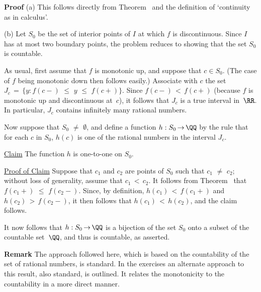 \V

        {\bf Proof} (a) This follows directly from Theorem~ and the definition of `continuity as in calculus'.

\V

        (b) Let $S_{0}$ be the set of interior points of $I$ at which $f$ is discontinuous.
    Since $I$ has at most two boundary points, the problem reduces to showing that the set $S_{0}$ is countable.

    As usual, first assume that $f$ is monotonic up, and suppose that $c{\in}S_{0}$. (The case of $f$ being monotonic down then follows easily.)
    Associate with $c$ the set $J_{c} \,=\, \{y: f(c-)\,\,{\leq}\,\,y\,\,{\leq}\,\,f(c+)\}$.
    Since $f(c-)\,<\,f(c+)$ (because $f$ is monotonic up and discontinuous at~$c$),
    it follows that $J_{c}$ is a true interval in~${\RR}$. In particular, $J_{c}$ contains infinitely many rational numbers.

        Now suppose that $S_{0} \,\,{\neq}\,\, {\emptyset}$, and define a function $h:S_{0} \,{\rightarrow}\, {\QQ}$
    by the rule that for each $c$ in $S_{0}$, $h(c)$ is one of the rational numbers in the interval $J_{c}$.

        \underline{Claim} The function $h$ is one-to-one on $S_{0}$.

        \underline{Proof of Claim} Suppose that $c_{1}$ and $c_{2}$ are points of $S_{0}$ such that $c_{1} \,\,{\neq}\,\, c_{2}$;
    without loss of generality, assume that $c_{1}\,<\,c_{2}$.
    It follows from Theorem~ that $f(c_{1}+)\,\,{\leq}\,\,f(c_{2}-)$. Since, by definition, 
    $h(c_{1})\,<\,f(c_{1}+)$ and  $h(c_{2})\,>\,f(c_{2}-)$, it then follows that $h(c_{1})\,<\,h(c_{2})$, and the claim follows.

        It now follows that $h:S_{0} \,{\rightarrow}\, {\QQ}$ is a  bijection of the set $S_{0}$ onto a subset of the countable set~${\QQ}$, and thus is countable, as asserted.

\V

        {\bf Remark} The approach followed here, which is based on the countability of the set of rational numbers, is standard.
    In the exercises an alternate approach to this result, also standard, is outlined.
    It relates the monotonicity to the countability in a more direct manner.



